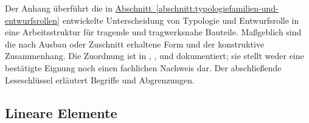\label{anlage:typologie}


Der Anhang überführt die in \hyperref[abschnitt:typologiefamilien-und-entwurfsrollen]{Abschnitt~\ref*{abschnitt:typologiefamilien-und-entwurfsrollen}} entwickelte Unterscheidung von Typologie und Entwurfsrolle in eine Arbeitsstruktur für tragende und tragwerksnahe Bauteile. Maßgeblich sind die nach Ausbau oder Zuschnitt erhaltene Form und der konstruktive Zusammenhang. Die Zuordnung ist in , ,  und  dokumentiert; sie stellt weder eine bestätigte Eignung noch einen fachlichen Nachweis dar. Der abschließende Leseschlüssel erläutert Begriffe und Abgrenzungen.



\subsection{Lineare Elemente}


